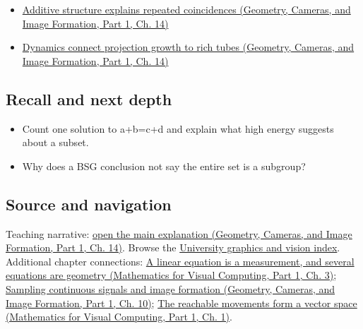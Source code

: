 \hypertarget{appendix-b0732b22e7d6-full-teaching-explanation}{}

\begin{itemize}
\tightlist
\item
  \href{../03-Geometry-Cameras-and-Image-Formation-P01/main.pdf\#nameddest=04-visual-computing-ii-ch033-additive-structure-explains-repeated-coincidences}{Additive structure explains repeated coincidences (Geometry, Cameras, and Image Formation, Part 1, Ch. 14)}
\item
  \href{../03-Geometry-Cameras-and-Image-Formation-P01/main.pdf\#nameddest=04-visual-computing-ii-ch033-dynamics-connect-projection-growth-to-rich-tubes}{Dynamics connect projection growth to rich tubes (Geometry, Cameras, and Image Formation, Part 1, Ch. 14)}
\end{itemize}

\subsection{Recall and next depth}\label{appendix-b0732b22e7d6-recall-and-next-depth}

\hypertarget{appendix-b0732b22e7d6-recall-and-next-depth}{}

\begin{itemize}
\tightlist
\item
  Count one solution to a+b=c+d and explain what high energy suggests about a subset.
\item
  Why does a BSG conclusion not say the entire set is a subgroup?
\end{itemize}

\subsection{Source and navigation}\label{appendix-b0732b22e7d6-source-and-navigation}

\hypertarget{appendix-b0732b22e7d6-source-and-navigation}{}

Teaching narrative: \href{../03-Geometry-Cameras-and-Image-Formation-P01/main.pdf\#nameddest=04-visual-computing-ii-ch033-additive-structure-explains-repeated-coincidences}{open the main explanation (Geometry, Cameras, and Image Formation, Part 1, Ch. 14)}. Browse the \hyperref[appendix-a6d556a4ef50-university-graphics-vision-and-photography---independent-series]{University graphics and vision index}. Additional chapter connections: \href{../02-Mathematics-for-Visual-Computing-P01/main.pdf\#nameddest=01-foundations-i-ch019-a-linear-equation-is-a-measurement-and-several-equations-are-geometry}{A linear equation is a measurement, and several equations are geometry (Mathematics for Visual Computing, Part 1, Ch. 3)}; \href{../03-Geometry-Cameras-and-Image-Formation-P01/main.pdf\#nameddest=03-visual-computing-i-ch003-sampling-continuous-signals-and-image-formation}{Sampling continuous signals and image formation (Geometry, Cameras, and Image Formation, Part 1, Ch. 10)}; \href{../02-Mathematics-for-Visual-Computing-P01/main.pdf\#nameddest=01-foundations-i-ch017-the-reachable-movements-form-a-vector-space}{The reachable movements form a vector space (Mathematics for Visual Computing, Part 1, Ch. 1)}.

